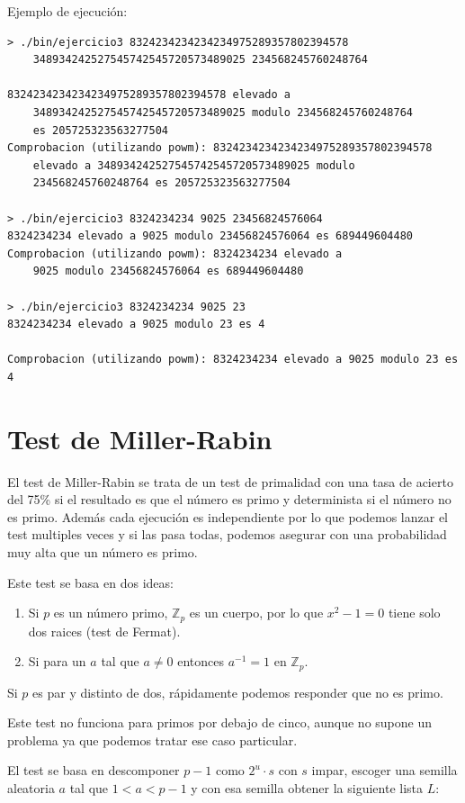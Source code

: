 \documentclass[12pt, spanish]{article}
\begin{document}
Ejemplo de ejecución:

\begin{lstlisting}
> ./bin/ejercicio3 8324234234234234975289357802394578
	348934242527545742545720573489025 234568245760248764

8324234234234234975289357802394578 elevado a
	348934242527545742545720573489025 modulo 234568245760248764
	es 205725323563277504
Comprobacion (utilizando powm): 8324234234234234975289357802394578
	elevado a 348934242527545742545720573489025 modulo
	234568245760248764 es 205725323563277504

> ./bin/ejercicio3 8324234234 9025 23456824576064
8324234234 elevado a 9025 modulo 23456824576064 es 689449604480
Comprobacion (utilizando powm): 8324234234 elevado a
	9025 modulo 23456824576064 es 689449604480

> ./bin/ejercicio3 8324234234 9025 23
8324234234 elevado a 9025 modulo 23 es 4

Comprobacion (utilizando powm): 8324234234 elevado a 9025 modulo 23 es 4
\end{lstlisting}

\section{Test de Miller-Rabin}

El test de Miller-Rabin se trata de un test de primalidad con una tasa de acierto del 75\% si el resultado es que el número es primo y determinista si el número no es primo. Además cada ejecución es independiente por lo que podemos lanzar el test multiples veces y si las pasa todas, podemos asegurar con una probabilidad muy alta que un número es primo.

Este test se basa en dos ideas:

\begin{enumerate}
	\item Si $p$ es un número primo, $\mathbb{Z}_p$ es un cuerpo, por lo que $x^2 - 1 = 0$ tiene solo dos raices (test de Fermat).
	\item Si para un $a$ tal que $a \neq 0$ entonces $a^{-1} = 1$ en $\mathbb{Z}_p$.
\end{enumerate}

Si $p$ es par y distinto de dos, rápidamente podemos responder que no es primo.

Este test no funciona para primos por debajo de cinco, aunque no supone un problema ya que podemos tratar ese caso particular.

El test se basa en descomponer $p - 1$ como $2^u \cdot s$ con $s$ impar, escoger una semilla aleatoria $a$ tal que $1 < a < p - 1$ y con esa semilla obtener la siguiente lista $L$:
\end{document}
